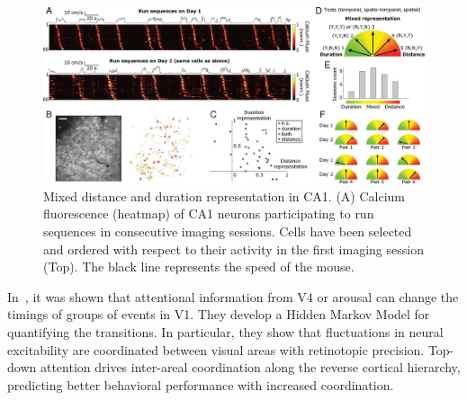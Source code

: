 \documentclass[brainsci, %
               review,submit,pdftex,moreauthors
               ]{Definitions/mdpi}
\begin{document}
\begin{figure}
\centering
\includegraphics{figures/haimerl2019.jpg}
\caption{
Mixed distance and duration representation in CA1. (A) Calcium fluorescence (heatmap) of CA1 neurons participating to run sequences in consecutive imaging sessions. Cells have been selected and ordered with respect to their activity in the first imaging session (Top). The black line represents the speed of the mouse.}\label{fig:haimerl}
\end{figure}



In~\citep{van_kempen_top-down_2021}, it was shown that attentional information from V4 or arousal can change the timings of groups of events in V1. They develop a Hidden Markov Model for quantifying the transitions. In particular, they show that fluctuations in neural excitability are coordinated between visual areas with retinotopic precision. Top-down attention drives inter-areal coordination along the reverse cortical hierarchy, predicting better behavioral performance with increased coordination. 
\end{document}
